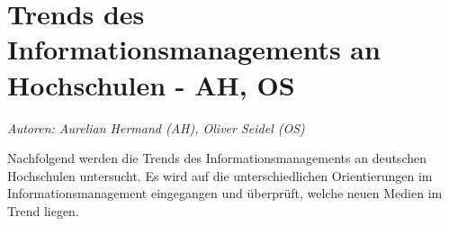 \chapter{Trends des Informationsmanagements an Hochschulen - AH, OS}
\textit{Autoren: Aurelian Hermand (AH), Oliver Seidel (OS)}

Nachfolgend werden die Trends des Informationsmanagements an deutschen Hochschulen untersucht. Es wird auf die unterschiedlichen Orientierungen im Informationsmanagement eingegangen und überprüft, welche neuen Medien im Trend liegen.





%

